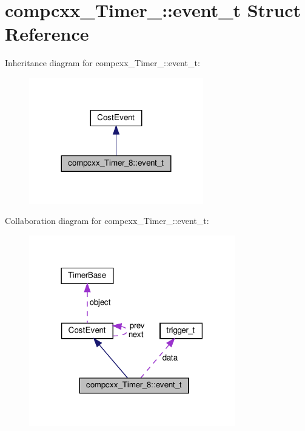 \hypertarget{structcompcxx__Timer__8_1_1event__t}{}\section{compcxx\+\_\+\+Timer\+\_\+:\+:event\+\_\+t Struct Reference}
\label{structcompcxx__Timer__8_1_1event__t}


Inheritance diagram for compcxx\+\_\+\+Timer\+\_\+:\+:event\+\_\+t\+:\nopagebreak
\begin{figure}[H]
\begin{center}
\leavevmode
\includegraphics[width=215pt]{structcompcxx__Timer__8_1_1event__t__inherit__graph}
\end{center}
\end{figure}


Collaboration diagram for compcxx\+\_\+\+Timer\+\_\+:\+:event\+\_\+t\+:\nopagebreak
\begin{figure}[H]
\begin{center}
\leavevmode
\includegraphics[width=254pt]{structcompcxx__Timer__8_1_1event__t__coll__graph}
\end{center}
\end{figure}
